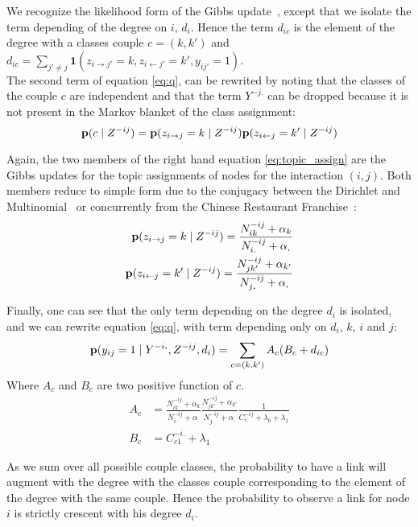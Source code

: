 We recognize the likelihood form of the Gibbs update~\cite{HDP}, except that we isolate the term depending of the degree on $i$, $d_i$. Hence the term $d_{ic}$ is the element of the degree with a classes couple $c=(k,k')$ and $d_{ic} = \sum_{j' \neq j} \bm{1}(z_{i\rightarrow j'}=k, z_{i\leftarrow j'}=k', y_{ij'}=1) $.\\

The second term of equation \eqref{eq:q}, can be rewrited by noting that the classes of the couple $c$ are independent and that the term $Y^{-j\bm{.}}$ can be dropped because it is not present in the Markov blanket of the class assignment: 
\begin{equation} \label{eq:topic_assign}
\pr(c \mid  Z^{-ij} ) =  \pr(z_{i\rightarrow j}=k \mid Z^{-ij}) \pr(z_{i\leftarrow j}=k' \mid Z^{-ij})
\end{equation}

Again, the two members of the right hand equation \eqref{eq:topic_assign} are the Gibbs updates for the topic assignments of nodes for the interaction $(i,j)$. Both members reduce to simple form due to the conjugacy between the Dirichlet and Multinomial~\cite{DM} or concurrently from the Chinese Restaurant Franchise~\cite{HDP}:
\begin{align}
\mathbf{p}(z_{i\rightarrow j}=k \mid Z^{-ij}) = \frac{N_{ik}^{-ij} + \alpha_k}{ N_{i.}^{-ij} + \alpha_{\bm{.}} } \\
\mathbf{p}(z_{i\leftarrow j}=k' \mid Z^{-ij}) = \frac{N_{jk'}^{-ij} + \alpha_{k'}}{ N_{j\bm{.}}^{-ij} + \alpha_{\bm{.}} } 
\end{align}

Finally, one can see that the only term depending on the degree $d_i$ is isolated, and we can rewrite equation \eqref{eq:q}, with term depending only on $d_i$, $k$, $i$ and $j$:
\begin{equation}
\mathbf{p}(y_{ij}=1 \mid Y^{-i\bm{.}}, Z^{-ij}, d_i ) = \sum_{c=(k, k')} A_c (B_c + d_{ic})
\end{equation}
Where $A_c$ and $B_c$ are two positive function of $c$.
\begin{align}
A_c &= \frac{N_{ik}^{-ij} + \alpha_k}{ N_{i.}^{-ij} + \alpha_{\bm{.}} } \frac{N_{jk'}^{-ij} + \alpha_{k'}}{ N_{j\bm{.}}^{-ij} + \alpha_{\bm{.}} } \frac{1}{C_{c\bm{.}}^{-ij} + \lambda_0+\lambda_1} \\
B_c &= C_{c1}^{-i.} + \lambda_1
\end{align}

As we sum over all possible couple classes, the probability to have a link will augment with the degree with the classes couple corresponding to the element of the degree with the same couple. Hence the probability to observe a link for node $i$ is strictly crescent with his degree $d_i$. 

